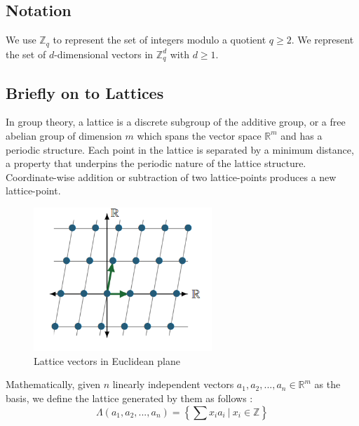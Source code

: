 \documentclass[11pt,
  titlepage=false,
  abstract=on,
]{scrreprt}
\begin{document}
\subsection{Notation}
We use $\mathbb{Z}_q$ to represent the set of integers modulo a quotient $q \geq 2$. We represent the set of $d$-dimensional vectors in $\mathbb{Z}^d_q$
with $d \geq 1$.
\subsection{Briefly on to Lattices}
In group theory, a lattice is a discrete subgroup of the additive group, or a free abelian group of dimension $m$ which spans the vector space $\mathbb{R}^m$ and has a periodic structure. 
Each point in the lattice is separated by a minimum distance, a property that underpins the periodic nature of the lattice structure. Coordinate-wise addition or subtraction of two lattice-points 
produces a new lattice-point.





\begin{figure}[h]
  \centering
  \includegraphics[width=0.6\textwidth]{figures/lattice-with-lattice-vectors.png}
  \caption{Lattice vectors in Euclidean plane \cite{latticesInPQC}}
  \label{fig:LatticeWithLatticeVectors}
\end{figure}


Mathematically, given $n$ linearly independent vectors $a_1, a_2,..., a_n \in \mathbb{R}^m$ as the basis, we define the lattice generated by them as follows \cite{latticesIntro2004}:
\begin{equation*}
  \Lambda(a_1, a_2,..., a_n) = \left\{\sum x_ia_i\ |\ x_i \in \mathbb{Z}\right\} 
\end{equation*}
\end{document}
